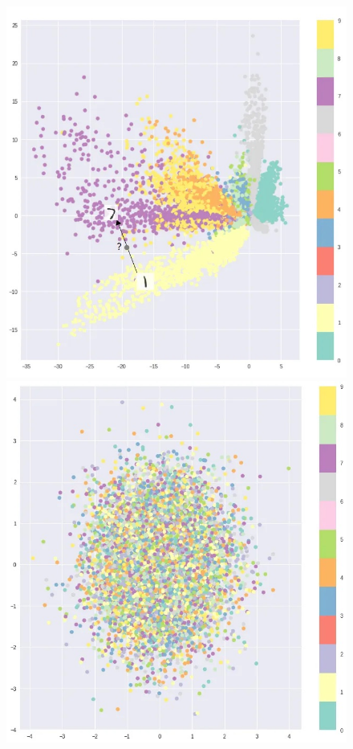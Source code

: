 \begin{figure}[!htbp]
    \begin{minipage}[t]{.3\textwidth}
        \centering
        \includegraphics[width=\textwidth]{tikz/chapter9 - Latent Space VAEs 1.jpeg}
    \end{minipage}
    \hfill
    \begin{minipage}[t]{.3\textwidth}
        \centering
        \includegraphics[width=\textwidth]{tikz/chapter9 - Latent Space VAEs 2.jpeg}

\end{minipage}
\end{figure}
